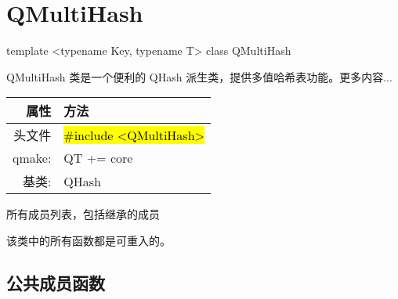 \chapter{QMultiHash}

template <typename Key, typename T> class QMultiHash

QMultiHash 类是一个便利的 QHash 派生类，提供多值哈希表功能。更多内容...

\begin{tabular}{|r|l|}
	\hline
	属性 & 方法 \\
	\hline
    头文件  &	\hl{\#include <QMultiHash>} \\
    \hline
    qmake: & QT += core    \\
    \hline
    基类: & QHash    \\
	\hline
\end{tabular}

\begin{compactitem}[\arr]
\item 所有成员列表，包括继承的成员
\end{compactitem}

\begin{notice}
该类中的所有函数都是可重入的。
\end{notice}


\section{公共成员函数}


